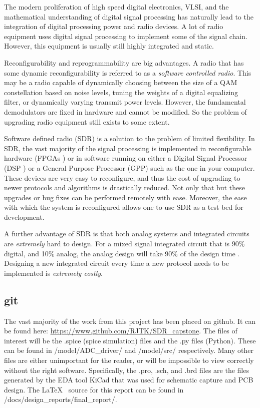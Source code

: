 \documentclass[a4paper, 12pt, notitlepage]{article}
\begin{document}
The modern proliferation of high speed digital electronics, VLSI, and the mathematical understanding of digital signal processing has naturally lead to the integration of digital processing power and radio devices.  A lot of radio equipment uses digital signal processing to implement some of the signal chain.  However, this equipment is usually still highly integrated and static.

Reconfigurability and reprogrammability are big advantages.  A radio that has some dynamic reconfigurability is referred to as a \textit{software controlled radio}.  This may be a radio capable of dynamically choosing between the size of a QAM constellation based on noise levels, tuning the weights of a digital equalizing filter, or dynamically varying transmit power levels.  However, the fundamental demodulators are fixed in hardware and cannot be modified.  So the problem of upgrading radio equipment still exists to some extent.

Software defined radio (SDR) is a solution to the problem of limited flexibility.  In SDR, the vast majority of the signal processing is implemented in reconfigurable hardware (FPGAs \cite{fpga_defn}) or in software running on either a Digital Signal Processor (DSP \cite{dsp_defn}) or a General Purpose Processor (GPP) such as the one in your computer.  These devices are very easy to reconfigure, and thus the cost of upgrading to newer protocols and algorithms is drastically reduced.  Not only that but these upgrades or bug fixes can be performed remotely with ease.  Moreover, the ease with which the system is reconfigured allows one to use SDR as a test bed for development.

A further advantage of SDR is that both analog systems and integrated circuits are \textit{extremely} hard to design.  For a mixed signal integrated circuit that is 90\% digital, and 10\% analog, the analog design will take 90\% of the design time \cite{ana_why}.  Designing a new integrated circuit every time a new protocol needs to be implemented is \textit{extremely costly}.


\subsection{git}
\label{sec:git}
The vast majority of the work from this project has been placed on github.  It can be found here: \url{https://www.github.com/RJTK/SDR_capstone}.  The files of interest will be the .spice (spice simulation) files and the .py files (Python).  These can be found in /model/ADC\_driver/ and /model/src/ respectively.  Many other files are either unimportant for the reader, or will be impossible to view correctly without the right software.   Specifically, the .pro, .sch, and .brd files are the files generated by the EDA tool KiCad \cite{kicad} that was used for schematic capture and PCB design.  The \LaTeX~ source for this report can be found in /docs/design\_reports/final\_report/.
\end{document}
